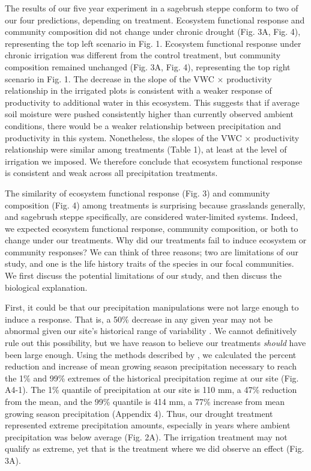 \documentclass[fleqn,10pt,lineno]{wlpeerj} %
\begin{document}
The results of our five year experiment in a sagebrush steppe conform to
two of our four predictions, depending on treatment. Ecosystem
functional response and community composition did not change under
chronic drought (Fig. 3A, Fig. 4), representing the top left scenario in
Fig. 1. Ecosystem functional response under chronic irrigation was
different from the control treatment, but community composition remained
unchanged (Fig. 3A, Fig. 4), representing the top right scenario in Fig.
1. The decrease in the slope of the VWC \(\times\) productivity
relationship in the irrigated plots is consistent with a weaker response
of productivity to additional water in this ecosystem. This suggests
that if average soil moisture were pushed consistently higher than
currently observed ambient conditions, there would be a weaker
relationship between precipitation and productivity in this system.
Nonetheless, the slopes of the VWC \(\times\) productivity relationship
were similar among treatments (Table 1), at least at the level of
irrigation we imposed. We therefore conclude that ecosystem functional
response is consistent and weak across all precipitation treatments.

The similarity of ecosystem functional response (Fig. 3) and community
composition (Fig. 4) among treatments is surprising because grasslands
generally, and sagebrush steppe specifically, are considered
water-limited systems. Indeed, we expected ecosystem functional
response, community composition, or both to change under our treatments.
Why did our treatments fail to induce ecosystem or community responses?
We can think of three reasons; two are limitations of our study, and one
is the life history traits of the species in our focal communities. We
first discuss the potential limitations of our study, and then discuss
the biological explanation.

First, it could be that our precipitation manipulations were not large
enough to induce a response. That is, a 50\% decrease in any given year
may not be abnormal given our site's historical range of variability
\citep{Knapp2017}. We cannot definitively rule out this possibility, but
we have reason to believe our treatments \emph{should} have been large
enough. Using the methods described by \citet{Lemoine2016}, we
calculated the percent reduction and increase of mean growing season
precipitation necessary to reach the 1\% and 99\% extremes of the
historical precipitation regime at our site (Fig. A4-1). The 1\%
quantile of precipitation at our site is 110 mm, a 47\% reduction from
the mean, and the 99\% quantile is 414 mm, a 77\% increase from mean
growing season precipitation (Appendix 4). Thus, our drought treatment
represented extreme precipitation amounts, especially in years where
ambient precipitation was below average (Fig. 2A). The irrigation
treatment may not qualify as extreme, yet that is the treatment where we
did observe an effect (Fig. 3A).
\end{document}
